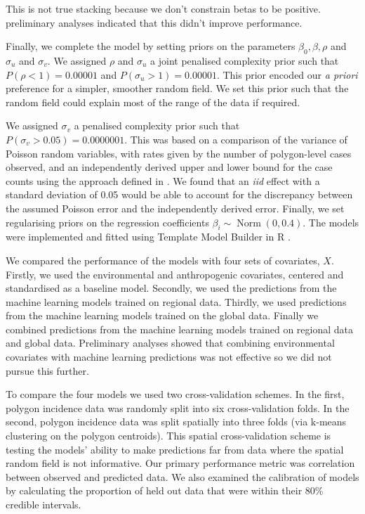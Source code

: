 \documentclass[11pt]{article}
\begin{document}
This is not true stacking because we don't constrain betas to be positive.
preliminary analyses indicated that this didn't improve performance.

Finally, we complete the model by setting priors on the parameters $\beta_0, \beta, \rho$ and $\sigma_u$ and $\sigma_v$. 
We assigned $\rho$ and $\sigma_u$ a joint penalised complexity prior \citep{fuglstad2018constructing} such that $P(\rho < 1) = 0.00001$ and $P(\sigma_u > 1) = 0.00001$. 
This prior encoded our \emph{a priori} preference for a simpler, smoother random field.
We set this prior such that the random field could explain most of the range of the data if required.

We assigned $\sigma_v$ a penalised complexity prior \citep{simpson2017penalising} such that $P(\sigma_v > 0.05) = 0.0000001$. 
This was based on a comparison of the variance of Poisson random variables, with rates given by the number of polygon-level cases observed, and an independently derived upper and lower bound for the case counts using the approach defined in \citep{cibulskis2011worldwide}. 
We found that an \emph{iid} effect with a standard deviation of 0.05 would be able to account for the discrepancy between the assumed Poisson error and the independently derived error.
Finally, we set regularising priors on the regression coefficients $\beta_i \sim \operatorname{ Norm}(0, 0.4)$. 
The models were implemented and fitted using Template Model Builder \citep{TMB} in R \citep{R}.

We compared the performance of the models with four sets of covariates, $X$.
Firstly, we used the environmental and anthropogenic covariates, centered and standardised as a baseline model.
Secondly, we used the predictions from the machine learning models trained on regional data.
Thirdly, we used predictions from the machine learning models trained on the global data.
Finally we combined predictions from the machine learning models trained on regional data and global data.
Preliminary analyses showed that combining environmental covariates with machine learning predictions was not effective so we did not pursue this further.


To compare the four models we used two cross-validation schemes. 
In the first, polygon incidence data was randomly split into six cross-validation folds.
In the second, polygon incidence data was split spatially into three folds (via k-means clustering on the polygon centroids).
This spatial cross-validation scheme is testing the models' ability to make predictions far from data where the spatial random field is not informative.
Our primary performance metric was correlation between observed and predicted data.
We also examined the calibration of models by calculating the proportion of held out data that were within their 80\% credible intervals.
\end{document}
